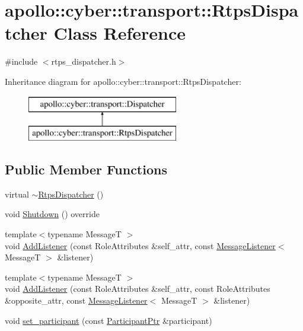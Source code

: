 \hypertarget{classapollo_1_1cyber_1_1transport_1_1RtpsDispatcher}{\section{apollo\-:\-:cyber\-:\-:transport\-:\-:Rtps\-Dispatcher Class Reference}
\label{classapollo_1_1cyber_1_1transport_1_1RtpsDispatcher}
}


{\ttfamily \#include $<$rtps\-\_\-dispatcher.\-h$>$}

Inheritance diagram for apollo\-:\-:cyber\-:\-:transport\-:\-:Rtps\-Dispatcher\-:\begin{figure}[H]
\begin{center}
\leavevmode
\includegraphics[height=2.000000cm]{classapollo_1_1cyber_1_1transport_1_1RtpsDispatcher}
\end{center}
\end{figure}
\subsection*{Public Member Functions}
\begin{DoxyCompactItemize}
\item 
virtual \hyperlink{classapollo_1_1cyber_1_1transport_1_1RtpsDispatcher_a84ab3f3d90a3c50d1a8fb0afd63126e2}{$\sim$\-Rtps\-Dispatcher} ()
\item 
void \hyperlink{classapollo_1_1cyber_1_1transport_1_1RtpsDispatcher_a6dae71a55d15ec41f5ca6b5bfb9a452a}{Shutdown} () override
\item 
{\footnotesize template$<$typename Message\-T $>$ }\\void \hyperlink{classapollo_1_1cyber_1_1transport_1_1RtpsDispatcher_aaf9d49e9165cebef7e3706f7f8f22720}{Add\-Listener} (const Role\-Attributes \&self\-\_\-attr, const \hyperlink{namespaceapollo_1_1cyber_1_1transport_aade3f4d41770972ae44166cdde27e2d8}{Message\-Listener}$<$ Message\-T $>$ \&listener)
\item 
{\footnotesize template$<$typename Message\-T $>$ }\\void \hyperlink{classapollo_1_1cyber_1_1transport_1_1RtpsDispatcher_aa4e5d5bc5366dc297b73b7dd4c353a27}{Add\-Listener} (const Role\-Attributes \&self\-\_\-attr, const Role\-Attributes \&opposite\-\_\-attr, const \hyperlink{namespaceapollo_1_1cyber_1_1transport_aade3f4d41770972ae44166cdde27e2d8}{Message\-Listener}$<$ Message\-T $>$ \&listener)
\item 
void \hyperlink{classapollo_1_1cyber_1_1transport_1_1RtpsDispatcher_a2904e5f8ca347113cdd547ff1920fe68}{set\-\_\-participant} (const \hyperlink{namespaceapollo_1_1cyber_1_1transport_a4214d0780331276d0384d0b57e3bc688}{Participant\-Ptr} \&participant)
\end{DoxyCompactItemize}

